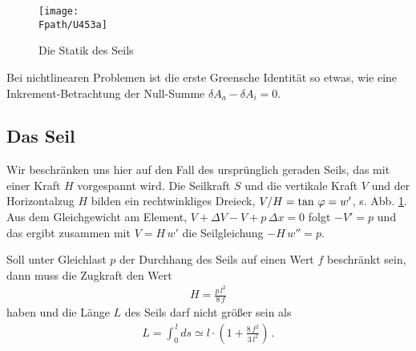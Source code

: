 \begin{figure}[tbp]
\centering
\if {} \sidecaption \fi
\texttt{[image: \\Fpath/U453a]}
\caption{Die Statik des Seils} \label{U453}
\end{figure}%

Bei nichtlinearen Problemen ist die erste Greensche Identit\"{a}t so etwas, wie eine \glq Inkrement-Betrachtung\grq{} der Null-Summe $ \delta A_a - \delta A_i = 0$.

\textcolor{sectionTitleBlue}{\section{Das Seil}}\label{Seilstatik}
Wir beschr\"{a}nken uns hier auf den Fall des urspr\"{u}nglich geraden Seils, das mit einer Kraft $H$ vorgespannt wird. Die Seilkraft $S$ und die vertikale Kraft $V$ und der Horizontalzug $H$ bilden ein rechtwinkliges Dreieck, $V/H = \tan\,\varphi = w'$, s. Abb. \ref{U453}. Aus dem Gleichgewicht am Element, $V + \Delta V - V + p\,\Delta x = 0$ folgt $-V' = p$ und das ergibt zusammen mit $V = H\,w'$ die Seilgleichung $-H\,w'' = p$.

Soll unter Gleichlast $p$ der Durchhang des Seils auf einen Wert $f$ beschr\"{a}nkt sein, dann muss die Zugkraft den Wert
\begin{align}
H = \frac{p\,l^2}{8\,f}
\end{align}
haben und die L\"{a}nge $L$ des Seils darf nicht gr\"{o}{\ss}er sein als
\begin{align}
L = \int_0^{\,l} ds \simeq l \cdot (1 + \frac{8\,f^2}{3\,l^2})\,.
\end{align}

